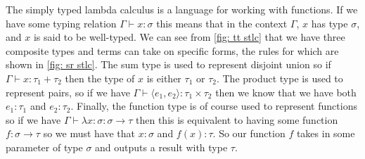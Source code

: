 \noindent
The simply typed lambda calculus is a language for working with functions. If we have some typing
relation $\Gamma \vdash x: \sigma$ this means that in the context $\Gamma$, $x$ has type $\sigma$,
and $x$ is said to be well-typed. We can see from \ref{fig: tt stlc} that we have three composite
types and terms can take on specific forms, the rules for which are shown in \ref{fig: sr stlc}. The
sum type is used to represent disjoint union so if $\Gamma \vdash x: \tau_1 + \tau_2$ then the type 
of $x$ is either $\tau_1$ or $\tau_2$. The product type is used to represent pairs, so if we have
$\Gamma \vdash \langle e_1, e_2 \rangle : \tau_1 \times \tau_2$ then we know that we have both 
$e_1: \tau_1$ and $e_2: \tau_2$. Finally, the function type is of course used to represent functions
so if we have $\Gamma \vdash \lambda x: \sigma: \sigma \rightarrow \tau$ then this is equivalent to 
having some function $f : \sigma \rightarrow \tau$ so we must have that $x: \sigma$ and $f(x): \tau$. 
So our function $f$ takes in some parameter of type $\sigma$ and outputs a result with type $\tau$.
\\
